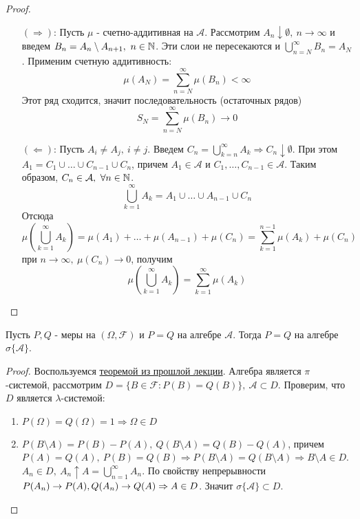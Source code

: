\documentclass[a4paper, 12pt]{article}
\begin{document}
\begin{proof}\tab
    \begin{itemize}
        \item[$(\Rightarrow)$:]
        Пусть $\mu$ - счетно-аддитивная на $\mathcal{A}$. Рассмотрим $A_n \downarrow \emptyset,\ n\to \infty$ и введем $B_n=A_n\setminus A_{n+1},\ n\in \mathbb{N}$. Эти слои не пересекаются и $\bigcup\limits_{n=N}^{\infty}B_n=A_N$. Применим счетную аддитивность: 
        \[\mu(A_N)=\sum\limits_{n=N}^{\infty}\mu(B_n)<\infty\]
        Этот ряд сходится, значит последовательность (остаточных рядов)
        \[S_N=\sum\limits_{n=N}^{\infty}\mu(B_n)\to 0\]
        \item[$(\Leftarrow)$:]
        Пусть $A_i\ne A_j,\ i\ne j$. Введем $C_n=\bigcup\limits_{k=n}^{\infty}A_k \Rightarrow C_n \downarrow \emptyset$. При этом \\
        $A_1=C_1\cup\dots\cup C_{n-1}\cup C_n$, причем $A_1\in \mathcal{A}$ и $C_1,\dots,C_{n-1}\in \mathcal{A}$. Таким образом, $C_n\in \mathcal{A},\ \forall n\in \mathbb{N}$. 
        \[\bigcup\limits_{k=1}^{\infty}A_k=A_1\cup\dots\cup A_{n-1}\cup C_n\]
        Отсюда
        \[\mu\left(\bigcup\limits_{k=1}^{\infty}A_k\right)=\mu(A_1)+ \dots +\mu(A_{n-1})+\mu(C_n)=\sum\limits_{k=1}^{n-1}\mu(A_k)+\mu(C_n)\]
        при $n\to \infty,\ \mu(C_n)\to 0$, получим 
        \[\mu\left(\bigcup\limits_{k=1}^{\infty}A_k\right)=\sum\limits_{k=1}^{\infty}\mu(A_k)\]
    \end{itemize}
\end{proof}
\begin{theorem}
    Пусть $P, Q$ - меры на $(\Omega, \mathcal{F})$ и $P=Q$ на алгебре $\mathcal{A}$. Тогда $P=Q$ на алгебре $\sigma\{\mathcal{A}\}$.
\end{theorem}
\begin{proof}
    Воспользуемся \hyperref[th1]{теоремой из прошлой лекции}. Алгебра является $\pi$-системой, рассмотрим $D=\{B\in \mathcal{F}: P(B)=Q(B)\},\ \mathcal{A}\subset D$. Проверим, что $D$ является $\lambda$-системой:
    \begin{enumerate}
        \item $P(\Omega)=Q(\Omega)=1 \Rightarrow \Omega\in D$
        \item $P(B\setminus A)=P(B)-P(A),\ Q(B\setminus A)=Q(B)-Q(A)$, причем\\
        $P(A)=Q(A),\ P(B)=Q(B) \Rightarrow P(B\setminus A)=Q(B\setminus A) \Rightarrow B\setminus A\in D$.
        $A_n\in D,\ A_n \uparrow A=\bigcup\limits_{n=1}^{\infty}A_n$. По свойству непрерывности $P(A_n)\to P(A),\\
        Q(A_n)\to Q(A) \Rightarrow A\in D$.
        Значит $\sigma\{\mathcal{A}\}\subset D$.
    \end{enumerate}
\end{proof}
\end{document}
